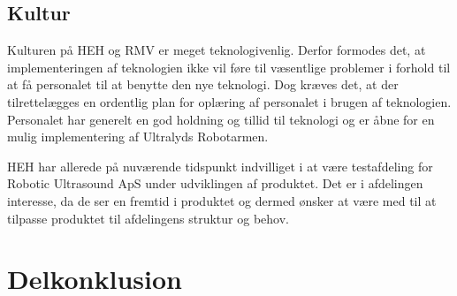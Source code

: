 \subsection{Kultur}
Kulturen på HEH og RMV er meget teknologivenlig. Derfor formodes det, at implementeringen af teknologien ikke vil føre til væsentlige problemer i forhold til at få personalet til at benytte den nye teknologi. Dog kræves det, at der tilrettelægges en ordentlig plan for oplæring af personalet i brugen af teknologien. Personalet har generelt en god holdning og tillid til teknologi og er åbne for en mulig implementering af Ultralyds Robotarmen.

HEH har allerede på nuværende tidspunkt indvilliget i at være testafdeling for Robotic Ultrasound ApS under udviklingen af produktet. Det er i afdelingen interesse, da de ser en fremtid i produktet og dermed ønsker at være med til at tilpasse produktet til afdelingens struktur og behov.   

\section{Delkonklusion}

